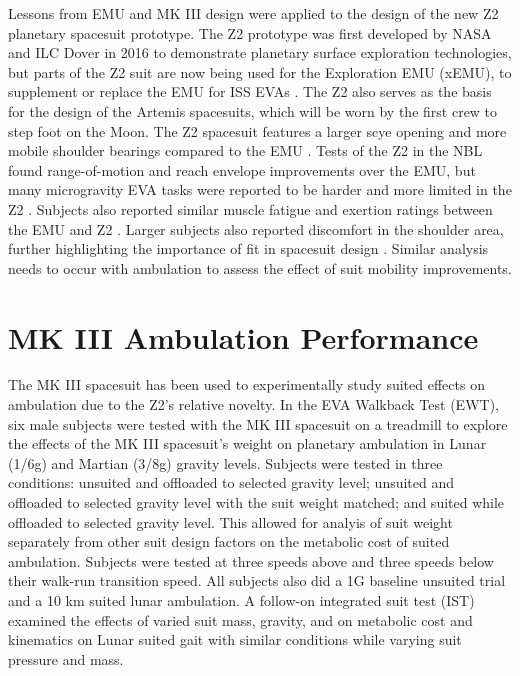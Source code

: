 \documentclass[defaultstyle,11pt]{comps}
\begin{document}
Lessons from EMU and MK III design were applied to the design of the new Z2 planetary spacesuit prototype.
The Z2 prototype was first developed by NASA and ILC Dover in 2016 to demonstrate planetary surface exploration technologies, but parts of the Z2 suit are now being used for the Exploration EMU (xEMU), to supplement or replace the EMU for ISS EVAs \citep{Graziosi2016, Meginnis2018}.
The Z2 also serves as the basis for the design of the Artemis spacesuits, which will be worn by the first crew to step foot on the Moon.
The Z2 spacesuit features a larger scye opening and more mobile shoulder bearings compared to the EMU \citep{Graziosi2016}.
Tests of the Z2 in the NBL found range-of-motion and reach envelope improvements over the EMU, but many microgravity EVA tasks were reported to be harder and more limited in the Z2 \citep{Meginnis2018}.
Subjects also reported similar muscle fatigue and exertion ratings between the EMU and Z2 \citep{Meginnis2018}.
Larger subjects also reported discomfort in the shoulder area, further highlighting the importance of fit in spacesuit design \citep{Meginnis2018}.
Similar analysis needs to occur with ambulation to assess the effect of suit mobility improvements.

\hypertarget{mk-iii-ambulation-performance}{%
\section{MK III Ambulation Performance}\label{mk-iii-ambulation-performance}}

The MK III spacesuit has been used to experimentally study suited effects on ambulation due to the Z2's relative novelty.
In the EVA Walkback Test (EWT), six male subjects were tested with the MK III spacesuit on a treadmill to explore the effects of the MK III spacesuit's weight on planetary ambulation in Lunar (1/6g) and Martian (3/8g) gravity levels.
Subjects were tested in three conditions: unsuited and offloaded to selected gravity level; unsuited and offloaded to selected gravity level with the suit weight matched; and suited while offloaded to selected gravity level\citep{Norcross2009}.
This allowed for analyis of suit weight separately from other suit design factors on the metabolic cost of suited ambulation.
Subjects were tested at three speeds above and three speeds below their walk-run transition speed.
All subjects also did a 1G baseline unsuited trial and a 10 km suited lunar ambulation.
A follow-on integrated suit test (IST) examined the effects of varied suit mass, gravity, and on metabolic cost and kinematics on Lunar suited gait \citep{Norcross2010} with similar conditions while varying suit pressure and mass.
\end{document}

